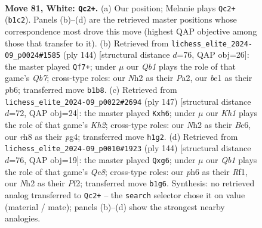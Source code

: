 \documentclass[11pt]{article}
\begin{document}
\clearpage

\begin{figure}[p]\centering
\begin{subfigure}{0.46\textwidth}\centering
\resizebox{\linewidth}{!}{%
\newchessgame
\chessboard[
  setfen={2k2r1r/p5p1/7p/q5PP/3P4/4P3/7N/1Q2b2K w - - 3 81},
  showmover=false,
  pgfstyle=straightmove, color=movearrow, markmove={b1-c2}
]}
\caption{}
\end{subfigure}\hfill
\begin{subfigure}{0.46\textwidth}\centering
\resizebox{\linewidth}{!}{%
\newchessgame
\chessboard[
  setfen={6k1/1Q6/1p1pP2q/8/4Pppr/8/PP3PK1/4R3 w - - 35 73},
  showmover=false,
  pgfstyle=straightmove, color=movearrow, markmove={b7-f7}
]}
\caption{}
\end{subfigure}
\\[4pt]
\begin{subfigure}{0.46\textwidth}\centering
\resizebox{\linewidth}{!}{%
\newchessgame
\chessboard[
  setfen={8/6pk/2b1p2P/qpP1P1p1/6P1/2R4K/3Q4/8 b - - 0 74},
  showmover=false,
  pgfstyle=straightmove, color=movearrow, markmove={h7-h6}
]}
\caption{}
\end{subfigure}\hfill
\begin{subfigure}{0.46\textwidth}\centering
\resizebox{\linewidth}{!}{%
\newchessgame
\chessboard[
  setfen={4Q3/1kp5/6p1/5p1p/2q4P/pr4P1/5P2/5RK1 w - - 0 73},
  showmover=false,
  pgfstyle=straightmove, color=movearrow, markmove={e8-g6}
]}
\caption{}
\end{subfigure}
\caption{\textbf{Move 81, White: \texttt{Qc2+}.} (a) Our position; Melanie plays \texttt{Qc2+} (\texttt{b1c2}). Panels (b)--(d) are the retrieved master positions whose correspondence most drove this move (highest QAP objective among those that transfer to it). (b) Retrieved from \texttt{lichess\_elite\_2024-09\_p0024\#1585} (ply 144) [structural distance $d$=76, QAP obj=26]: the master played \texttt{Qf7+}; under $\mu$ our \emph{Qb1} plays the role of that game's \emph{Qb7}; cross-type roles: our \emph{N}h2 as their \emph{P}a2, our \emph{b}e1 as their \emph{p}b6; transferred move \texttt{b1b8}. (c) Retrieved from \texttt{lichess\_elite\_2024-09\_p0022\#2694} (ply 147) [structural distance $d$=72, QAP obj=24]: the master played \texttt{Kxh6}; under $\mu$ our \emph{Kh1} plays the role of that game's \emph{Kh2}; cross-type roles: our \emph{N}h2 as their \emph{B}c6, our \emph{r}h8 as their \emph{p}g4; transferred move \texttt{h1g2}. (d) Retrieved from \texttt{lichess\_elite\_2024-09\_p0010\#1923} (ply 144) [structural distance $d$=76, QAP obj=19]: the master played \texttt{Qxg6}; under $\mu$ our \emph{Qb1} plays the role of that game's \emph{Qe8}; cross-type roles: our \emph{p}h6 as their \emph{R}f1, our \emph{N}h2 as their \emph{P}f2; transferred move \texttt{b1g6}. Synthesis: no retrieved analog transferred to \texttt{Qc2+} -- the \texttt{search} selector chose it on value (material / mate); panels (b)--(d) show the strongest nearby analogies.}
\label{fig:thought-m160}
\end{figure}
\end{document}
